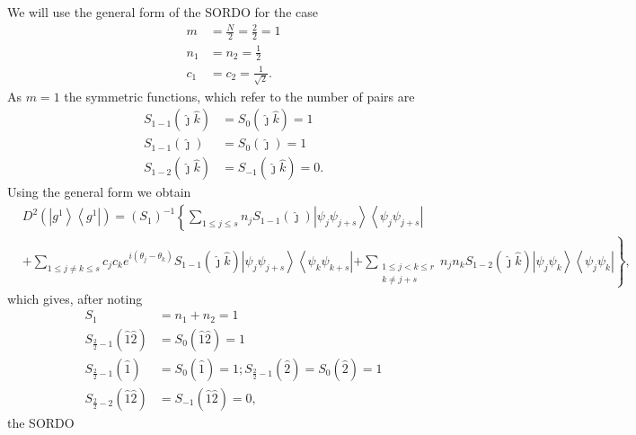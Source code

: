 \documentclass[aps,preprint]{revtex4}%
\begin{document}
We will use the general form of the SORDO for the case
\begin{align*}
m  &  =\frac{N}{2}=\frac{2}{2}=1\\
n_{1}  &  =n_{2}=\frac{1}{2}\\
c_{1}  &  =c_{2}=\frac{1}{\sqrt{2}}.
\end{align*}
As $m=1$ the symmetric functions, which refer to the number of pairs are
\begin{align*}
S_{1-1}\left(  \hat{\jmath}\hat{k}\right)   &  =S_{0}\left(  \hat{\jmath}%
\hat{k}\right)  =1\\
S_{1-1}\left(  \hat{\jmath}\right)   &  =S_{0}\left(  \hat{\jmath}\right)
=1\\
S_{1-2}\left(  \hat{\jmath}\hat{k}\right)   &  =S_{-1}\left(  \hat{\jmath}%
\hat{k}\right)  =0.
\end{align*}
Using the general form we obtain%
\begin{align*}
&  D^{2}\left(  \left\vert g^{1}\right\rangle \left\langle g^{1}\right\vert
\right)  =\left(  S_{1}\right)  ^{-1}\left\{  \sum_{1\leq j\leq s}n_{j}%
S_{1-1}\left(  \hat{\jmath}\right)  \left\vert \psi_{j}\psi_{j+s}\right\rangle
\left\langle \psi_{j}\psi_{j+s}\right\vert \right. \\
&  +\sum_{1\leq j\neq k\leq s}c_{j}c_{k}e^{i\left(  \theta_{j}-\theta
_{k}\right)  }S_{1-1}\left(  \hat{\jmath}\hat{k}\right)  \left\vert \psi
_{j}\psi_{j+s}\right\rangle \left\langle \psi_{k}\psi_{k+s}\right\vert \left.
+\sum_{\substack{1\leq j<k\leq r\\k\neq j+s}}n_{j}n_{k}S_{1-2}\left(
\hat{\jmath}\hat{k}\right)  \left\vert \psi_{j}\psi_{k}\right\rangle
\left\langle \psi_{j}\psi_{k}\right\vert \right\}  ,
\end{align*}
which gives, after noting
\begin{align*}
S_{1}  &  =n_{1}+n_{2}=1\\
S_{\frac{2}{2}-1}\left(  \hat{1}\hat{2}\right)   &  =S_{0}\left(  \hat{1}%
\hat{2}\right)  =1\\
S_{\frac{2}{2}-1}\left(  \hat{1}\right)   &  =S_{0}\left(  \hat{1}\right)
=1;S_{\frac{2}{2}-1}\left(  \hat{2}\right)  =S_{0}\left(  \hat{2}\right)  =1\\
S_{\frac{2}{2}-2}\left(  \hat{1}\hat{2}\right)   &  =S_{-1}\left(  \hat{1}%
\hat{2}\right)  =0,
\end{align*}
the SORDO%
\end{document}
